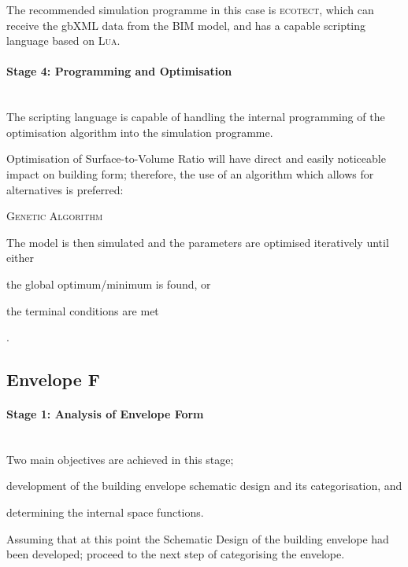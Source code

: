 The recommended simulation programme in this case is \textsc{ecotect}, which can receive the gbXML data from the BIM model, and has a capable scripting language based on \textsc{Lua}.

\paragraph{Stage 4: Programming and Optimisation}\mbox{}\\

The scripting language is capable of handling the internal programming of the optimisation algorithm into the simulation programme.

Optimisation of Surface-to-Volume Ratio will have direct and easily noticeable impact on building form; therefore, the use of an algorithm which allows for alternatives is preferred:

\begin{compactenum}
\item \textsc{Genetic Algorithm}
\end{compactenum}

The model is then simulated and the parameters are optimised iteratively until either \begin{inparaenum}[a)]\item the global optimum/minimum is found, or \item the terminal conditions are met\end{inparaenum}.


\clearpage
\subsection{Envelope F}

\paragraph{Stage 1: Analysis of Envelope Form}\mbox{}\\[2mm]

Two main objectives are achieved in this stage; \begin{inparaenum}[a)] \item development of the building envelope schematic design and its categorisation, and \item determining the internal space functions.\end{inparaenum}

Assuming that at this point the Schematic Design of the building envelope had been developed; proceed to the next step of categorising the envelope.

